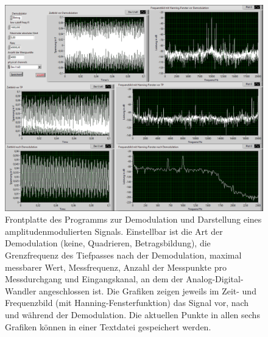 \documentclass[
a4paper,
12pt,
pagesize,
ngerman
]{scrartcl}
\begin{document}

	\begin{figure}[H]  
		\includegraphics[width=1.0\textwidth]{EIRE2018Dateien/Tag3/modifizierterOszi/Oszilloskop__modifiziertp}
		\centering
		\caption{
			Frontplatte des Programms zur Demodulation und Darstellung eines amplitudenmodulierten Signals.
			Einstellbar ist die Art der Demodulation (keine, Quadrieren, Betragsbildung), die Grenzfrequenz des Tiefpasses nach der Demodulation, maximal messbarer Wert, Messfrequenz, Anzahl der Messpunkte pro Messdurchgang und Eingangskanal, an dem der Analog-Digital-Wandler angeschlossen ist.
			Die Grafiken zeigen jeweils im Zeit- und Frequenzbild (mit Hanning-Fensterfunktion) das Signal vor, nach und während der Demodulation.
			Die aktuellen Punkte in allen sechs Grafiken können in einer Textdatei gespeichert werden.
		}
		\label{fig_tag3_am_demod_front}
		\centering
	\end{figure}
\end{document}
